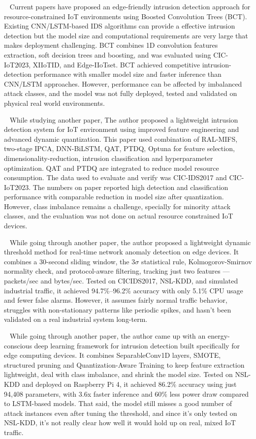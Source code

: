 \documentclass[]{interact}
\theoremstyle{plain}%
\theoremstyle{definition}
\theoremstyle{remark}
\begin{document}
~\cite{eict2025} Current papers have proposed an edge-friendly intrusion detection approach for resource-constrained IoT environments using Boosted Convolution Trees (BCT). Existing CNN/LSTM-based IDS algorithms can provide a effective intrusion detection but the model size and computational requirements are very large that makes deployment challenging. BCT combines 1D convolution features extraction, soft decision trees and boosting, and was evaluated using CIC-IoT2023, XIIoTID, and Edge-IIoTset. BCT achieved competitive intrusion-detection performance with smaller model size and faster inference than CNN/LSTM approaches. However, performance can be affected by imbalanced attack classes, and the model was not fully deployed, tested and validated on physical real world environments.

~\cite{lidsfiot2025} While studying another paper, The author proposed a lightweight intrusion detection system for IoT environment using improved feature engineering and advanced dynamic quantization. This paper used combination of RAL-MIFS, two-stage IPCA, DNN-BiLSTM, QAT, PTDQ, Optuna for feature selection, dimensionality-reduction, intrusion classification and hyperparameter optimization. QAT and PTDQ are integrated to reduce model resource consumption. The data used to evaluate and verify was CIC-IDS2017 and CIC-IoT2023. The numbers on paper reported high detection and classification performance with comparable reduction in model size after quantization. However, class imbalance remains a challenge, specially for minority attack classes, and the evaluation was not done on actual resource constrained IoT devices.

~\cite{dynamic_ids2025} While going through another paper, the author proposed a lightweight dynamic threshold method for real-time network anomaly detection on edge devices. It combines a 30-second sliding window, the 3$\sigma$ statistical rule, Kolmogorov-Smirnov normality check, and protocol-aware filtering, tracking just two features --- packets/sec and bytes/sec. Tested on CICIDS2017, NSL-KDD, and simulated industrial traffic, it achieved 94.7\%--96.2\% accuracy with only 5.1\% CPU usage and fewer false alarms. However, it assumes fairly normal traffic behavior, struggles with non-stationary patterns like periodic spikes, and hasn't been validated on a real industrial system long-term.

~\cite{energy_ids2025} While going through another paper, the author came up with an energy-conscious deep learning framework for intrusion detection built specifically for edge computing devices. It combines SeparableConv1D layers, SMOTE, structured pruning and Quantization-Aware Training to keep feature extraction lightweight, deal with class imbalance, and shrink the model size. Tested on NSL-KDD and deployed on Raspberry Pi 4, it achieved 86.2\% accuracy using just 94,408 parameters, with 3.6x faster inference and 60\% less power draw compared to LSTM-based models. That said, the model still misses a good number of attack instances even after tuning the threshold, and since it's only tested on NSL-KDD, it's not really clear how well it would hold up on real, mixed IoT traffic.
\end{document}

